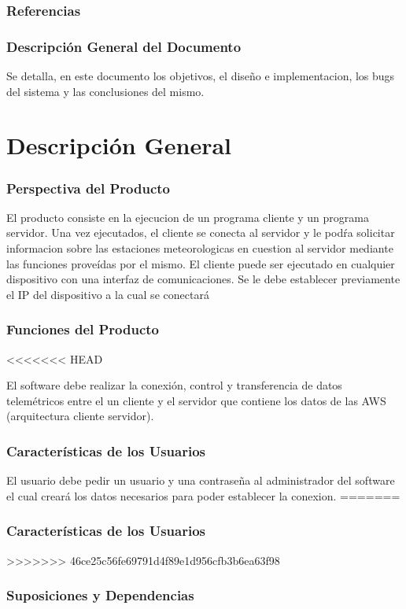 \documentclass[10pt, a4paper,notitlepage]{article}
\begin{document}
{\subsubsection{Referencias}

\subsubsection{Descripción General del Documento}
Se detalla, en este documento los objetivos, el diseño e implementacion, los bugs del sistema y las conclusiones del mismo.
\section{Descripción General}
\subsubsection{Perspectiva del Producto }
El producto consiste en la ejecucion de un programa cliente y un programa servidor.
Una vez ejecutados, el cliente se conecta al servidor y le podŕa solicitar informacion sobre las estaciones meteorologicas en cuestion al servidor mediante las funciones proveídas por el mismo.
El cliente puede ser ejecutado en cualquier dispositivo con una interfaz de comunicaciones. Se le debe establecer previamente el IP del dispositivo a la cual se conectará
\subsubsection{Funciones del Producto}
<<<<<<< HEAD

El software debe realizar la conexión, control y transferencia de datos telemétricos entre el un cliente y el servidor que contiene los
datos de las AWS (arquitectura cliente servidor).
\subsubsection{Características de los Usuarios }
El usuario debe pedir un usuario y una contraseña al administrador del software el cual creará los datos necesarios para poder establecer la conexion.
=======
\subsubsection{Características de los Usuarios }
>>>>>>> 46ce25c56fe69791d4f89e1d956cfb3b6ea63f98

\subsubsection{Suposiciones y Dependencias}

}
\end{document}
